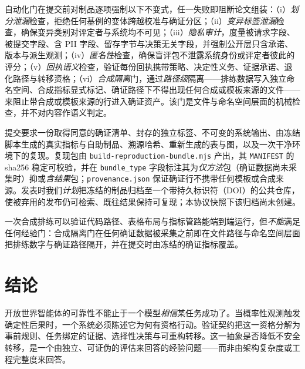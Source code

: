 \documentclass[11pt]{ctexart}
\begin{document}
自动化门在提交前对制品逐项强制以下不变式，任一失败即阻断论文组装：（i）\emph{划分泄漏}检查，拒绝任何基例的变体跨越校准与确证分区；（ii）\emph{变异标签泄漏}检查，确保变异类别对评定者与系统均不可见；（iii）\emph{隐私审计}，度量被请求字段、被提交字段、含 PII 字段、留存字节与决策无关字段，并强制公开层只含承诺、版本与派生观测；（iv）\emph{匿名性}检查，确保盲评包不泄露系统身份或评定者彼此的评分；（v）\emph{回执语义}检查，验证每份回执携带策略、决定性义务、证据承诺、退化路径与转移资格；（vi）\emph{合成隔离}门，通过\emph{路径级}隔离——排练数据写入独立命名空间、合成指标显式标记、确证路径下不得出现任何合成或模板来源的文件——来阻止带合成或模板来源的行进入确证资产。该门是文件与命名空间层面的机械检查，并不对内容作语义判定。

提交要求一份取得同意的确证清单、封存的独立标签、不可变的系统输出、由冻结脚本生成的真实指标与自助制品、溯源哈希、重新生成的表与图，以及一次干净环境下的复现。复现包由 \texttt{build-reproduction-bundle.mjs} 产出，其 \texttt{MANIFEST} 的 sha256 稳定可校验，并在 \texttt{bundle\_type} 字段标注其为\emph{仅方法}包（确证数据尚未采集时）抑或\emph{含结果}包；\texttt{provenance.json} 保证确证行不携带任何模板或合成来源。发表时我们\emph{计划}把冻结的制品归档至一个带持久标识符（DOI）的公共仓库，使被弃用的发布仍可检索、既往结果保持可复现；本协议快照下该归档尚未创建。

一次合成排练可以验证代码路径、表格布局与指标管路能端到端运行，但\emph{不能}满足任何经验门：合成隔离门在任何确证数据被采集之前即在文件路径与命名空间层面把排练数字与确证路径隔开，并在提交时由冻结的确证指标覆盖。

\section{结论}
开放世界智能体的可靠性不能止于一个模型\emph{相信}某任务成功了。当概率性观测触发确定性后果时，一个系统必须陈述它为何有资格行动。验证契约把这一资格分解为事前规则、任务绑定的证据、选择性决策与可重构转移。这一抽象是否降低不安全转移，是一个由独立、可证伪的评估来回答的经验问题——而非由架构复杂度或工程完整度来回答。



\end{document}

